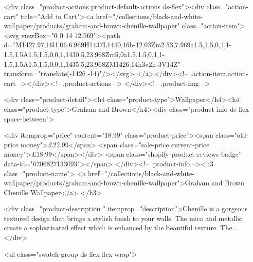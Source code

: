 {{{{{{{<div class="product-actions product-default-actions ds-flex"><div class="action-cart" title="Add to Cart"><a href="/collections/black-and-white-wallpaper/products/graham-and-brown-chenille-wallpaper" class="action-item"><svg viewBox="0 0 14 12.969"><path d="M1427.97,16l1.06,6.969H1437L1440,16h-12.03Zm2.53,7.969a1.5,1.5,0,1,1-1.5,1.5A1.5,1.5,0,0,1,1430.5,23.968Zm5,0a1.5,1.5,0,1,1-1.5,1.5A1.5,1.5,0,0,1,1435.5,23.968ZM1426,14h3v2h-3V14Z" transform="translate(-1426 -14)"/></svg>
</a></div><!-- .action-item.action-cart --></div><!-- .product-actions -->
</div><!-- .product-img -->

<div class="product-detail"><h4 class="product-type">Wallpaper</h4><h4 class="product-type">Graham and Brown</h4><div class="product-info ds-flex space-between">
    
<div itemprop="price" content="18.99" class="product-price"><span class="old-price money">£22.99</span>
    <span class="sale-price current-price money">£18.99</span></div>
    <span class="shopify-product-reviews-badge" data-id="6706827133093"></span>
  </div><!-- .product-info --><h3 class="product-name">
      <a href="/collections/black-and-white-wallpaper/products/graham-and-brown-chenille-wallpaper">Graham and Brown Chenille Wallpaper</a>
    </h3>
    
<div class="product-description " itemprop="description">Chenille is a gorgeous textured design that brings a stylish finish to your walls. The mica and metallic create a sophisticated effect which is enhanced by the beautiful texture. The...
</div>



<ul class="swatch-group ds-flex flex-wrap">
        
}}}}}}}
